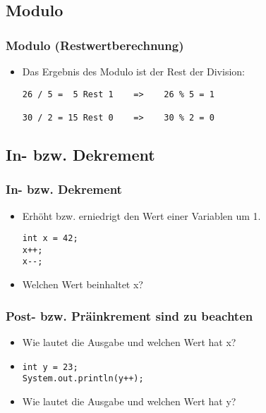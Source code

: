 \documentclass[final]{beamer}
\begin{document}
\subsection{Modulo}
\begin{frame}[fragile]
  \frametitle{Modulo (Restwertberechnung)}
  \begin{itemize}
    \item Das Ergebnis des Modulo ist der Rest der Division:
    \begin{lstlisting}
26 / 5 =  5 Rest 1    =>    26 % 5 = 1

30 / 2 = 15 Rest 0    =>    30 % 2 = 0
    \end{lstlisting}
  \end{itemize}
\end{frame}

\subsection{In- bzw. Dekrement}
\begin{frame}[fragile]
  \frametitle{In- bzw. Dekrement}
  \begin{itemize}
    \item Erhöht bzw. erniedrigt den Wert einer Variablen um 1.
    \begin{lstlisting}
int x = 42;
x++; 
x--;
    \end{lstlisting}
\item[] Welchen Wert beinhaltet x? 
  \end{itemize}
\end{frame}

\begin{frame}[fragile]
\frametitle{Post- bzw. Präinkrement sind zu beachten}
\begin{itemize}
    \begin{lstlisting}
int x = 23;
System.out.println(++x);
\end{lstlisting}
\item[] Wie lautet die Ausgabe und welchen Wert hat x? 
\item[]\quad
\begin{lstlisting}
int y = 23;
System.out.println(y++);
    \end{lstlisting}
\item[] Wie lautet die Ausgabe und welchen Wert hat y? 
  \end{itemize}
\end{frame}
\end{document}

